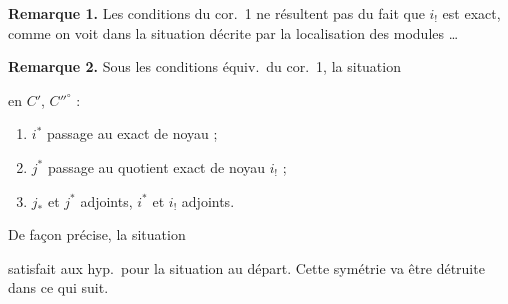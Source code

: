 \documentclass[11pt,a4paper]{article}
\begin{document}
\textbf{Remarque 1.} \struck{\ill{}} Les conditions du cor.\ 1 ne résultent
pas du fait que $i_{!}$ est exact, comme on voit dans la situation décrite par
la localisation des modules \ldots

\textbf{Remarque 2.} Sous les conditions équiv.\ du cor.\ 1, \ill{} la
situation


\ill{} \struck{\ill{}}  en $C'$, $C''^{\circ}$ :
\begin{enumerate}
\item[] $i^{*}$ passage au \struck{\ill{}} exact de noyau
       ;
\item[] $j^{*}$ passage au quotient exact de noyau $i_{!}$ ;
\item[] $j_{*}$ et $j^{*}$ adjoints, \quad $i^{*}$ et $i_{!}$ adjoints.
\end{enumerate}

De façon précise, la situation


satisfait \struck{\ill{}} aux hyp.\ pour la situation au départ. Cette
symétrie va être détruite dans ce qui suit.
\end{document}
